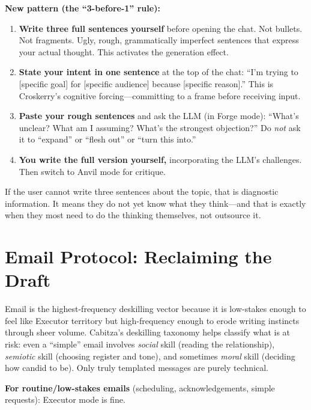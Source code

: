 \documentclass[11pt,a4paper]{article}
\begin{document}
\textbf{New pattern (the ``3-before-1'' rule):}
\begin{enumerate}
    \item \textbf{Write three full sentences yourself} before opening the chat.
    Not bullets. Not fragments. Ugly, rough, grammatically imperfect sentences
    that express your actual thought. This activates the generation effect.

    \item \textbf{State your intent in one sentence} at the top of the chat: ``I'm
    trying to [specific goal] for [specific audience] because [specific reason].''
    This is Croskerry's cognitive forcing---committing to a frame before receiving
    input.

    \item \textbf{Paste your rough sentences} and ask the LLM (in Forge mode):
    ``What's unclear? What am I assuming? What's the strongest objection?'' Do
    \emph{not} ask it to ``expand'' or ``flesh out'' or ``turn this into.''

    \item \textbf{You write the full version yourself,} incorporating the LLM's
    challenges. Then switch to Anvil mode for critique.
\end{enumerate}

If the user cannot write three sentences about the topic, that is diagnostic
information. It means they do not yet know what they think---and that is exactly
when they most need to do the thinking themselves, not outsource it.

\section{Email Protocol: Reclaiming the Draft}
\label{sec:email}

Email is the highest-frequency deskilling vector because it is low-stakes enough
to feel like Executor territory but high-frequency enough to erode writing
instincts through sheer volume. Cabitza's deskilling taxonomy helps classify
what is at risk: even a ``simple'' email involves \emph{social} skill (reading the
relationship), \emph{semiotic} skill (choosing register and tone), and sometimes
\emph{moral} skill (deciding how candid to be). Only truly templated messages are
purely technical.

\textbf{For routine/low-stakes emails} (scheduling, acknowledgements, simple
requests): Executor mode is fine.
\end{document}
